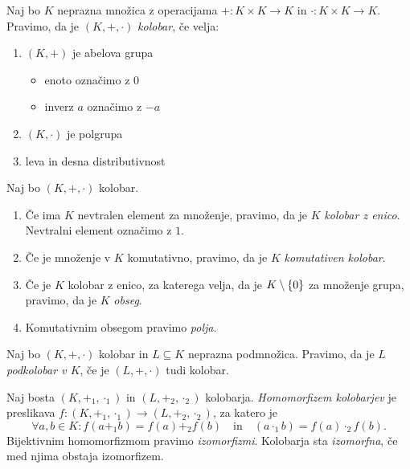 \documentclass[12pt, a4paper]{article}
\begin{document}
\begin{okvir}
\begin{definicija}
Naj bo $K$ neprazna množica z operacijama $+\colon K\times K\to K$ in $\cdot\colon K\times K\to K$. Pravimo, da je $(K,+,\cdot)$ \emph{kolobar}, če velja:

\begin{enumerate}[label=\roman*)]
\item $(K,+)$ je abelova grupa
\begin{itemize}
\item enoto označimo z $0$
\item inverz $a$ označimo z $-a$
\end{itemize}
\item $(K,\cdot)$ je polgrupa
\item leva in desna distributivnost
\end{enumerate}
\end{definicija}

\begin{definicija}
Naj bo $(K,+,\cdot)$ kolobar.

\begin{enumerate}[label=\roman*)]
\item Če ima $K$ nevtralen element za množenje, pravimo, da je $K$ \emph{kolobar z enico}. Nevtralni element označimo z $1$.
\item Če je množenje v $K$ komutativno, pravimo, da je $K$ \emph{komutativen kolobar}.
\item Če je $K$ kolobar z enico, za katerega velja, da je $K\setminus\left\{0\right\}$ za množenje grupa, pravimo, da je $K$ \emph{obseg}.
\item Komutativnim obsegom pravimo \emph{polja}.
\end{enumerate}
\end{definicija}
\end{okvir}

\begin{definicija}
Naj bo $(K,+,\cdot)$ kolobar in $L\subseteq K$ neprazna podmnožica. Pravimo, da je $L$ \emph{podkolobar v $K$}, če je $(L,+,\cdot)$ tudi kolobar.
\end{definicija}

\begin{definicija}
Naj bosta $(K,+_1,\cdot_1)$ in $(L,+_2,\cdot_2)$ kolobarja. \emph{Homomorfizem kolobarjev} je preslikava $f\colon (K,+_1,\cdot_1)\to(L,+_2,\cdot_2)$, za katero je
\[\forall a,b\in K\colon f(a +_1 b)=f(a) +_2 f(b)\quad\text{in}\quad (a \cdot_1 b)=f(a) \cdot_2 f(b).\]
Bijektivnim homomorfizmom pravimo \emph{izomorfizmi}. Kolobarja sta \emph{izomorfna}, če med njima obstaja izomorfizem.
\end{definicija}
\end{document}
